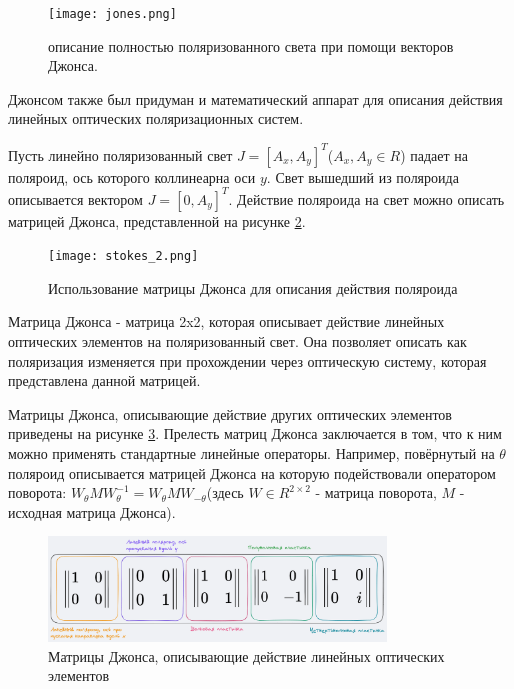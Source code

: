 \documentclass[a4paper]{article}
\begin{document}
\begin{figure}[htbp]
  \centering
  \texttt{[image: jones.png]}
  \caption{описание полностью поляризованного света при помощи векторов Джонса.}
  \label{fig:jones_vector_examples}
\end{figure}

Джонсом также был придуман и математический аппарат для описания действия линейных оптических поляризационных систем.

Пусть линейно поляризованный свет $J = [A_x, A_y]^{T}$($A_{x}, A_{y} \in R$) падает на поляроид, ось которого коллинеарна оси $y$. Свет вышедший из поляроида описывается вектором $J = [0, A_y]^{T}$. Действие поляроида на свет можно описать матрицей Джонса, представленной на рисунке \ref{fig:polaroid_responce_matrix}.


\begin{figure}[htbp]
  \centering
  \texttt{[image: stokes\_2.png]}
  \caption{Использование матрицы Джонса для описания действия поляроида}
  \label{fig:polaroid_responce_matrix}
\end{figure}


\textcolor{defenition}{Матрица Джонса} - матрица 2x2, которая описывает действие линейных оптических элементов на поляризованный свет. Она позволяет описать как поляризация изменяется при прохождении через оптическую систему, которая представлена данной матрицей. 



Матрицы Джонса, описывающие действие других оптических элементов приведены на рисунке \ref{fig:jones_matricies_examples}. Прелесть матриц Джонса заключается в том, что к ним можно применять стандартные линейные операторы. Например, повёрнутый на $\theta$ поляроид описывается матрицей Джонса на которую подействовали оператором поворота: $W_{\theta} M W_{\theta}^{-1} = W_{\theta} M W_{-\theta}$(здесь $W \in R^{2 \times 2} $ - матрица поворота, $M$ - исходная матрица Джонса). 

\begin{figure}[htbp]
  \centering
  \includegraphics[width= 0.8\textwidth]{polaroid_table.png}
  \caption{Матрицы Джонса, описывающие действие линейных оптических элементов}
  \label{fig:jones_matricies_examples}
\end{figure}
\end{document}
